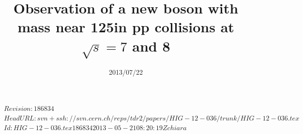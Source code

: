 \documentclass[12pt,twoside,a4paper,cmspaper,final,collab]{cms-tdr}
\begin{document}



\RCS$Revision: 186834 $
\RCS$HeadURL: svn+ssh://svn.cern.ch/reps/tdr2/papers/HIG-12-036/trunk/HIG-12-036.tex $
\RCS$Id: HIG-12-036.tex 186834 2013-05-21 08:20:19Z chiara $

\newlength\cmsFigWidth
{}%
  {\setlength{}}
\newlength\cmsFigWideWidth
{}%
  {\setlength{}}
%
  {\providecommand{\cmsRight}{right}}
\newcommand{\re}{\ensuremath{\cmsSymbolFace{e}}}

\providecommand{\Mjj}{\ensuremath{\mathit{m}(\mathrm{jj})}}
\providecommand{\ZllH}{\ensuremath{\cPZ(\ell\ell)\PH}}
\providecommand{\WlnH}{\ensuremath{\PW(\ell\cPgn)\PH}}
\providecommand\WtoLN {\ensuremath{\PW\to\ell\cPgn}}
\providecommand{\ZtoNN}{\ensuremath{\cPZ\to\cPgn\cPagn}}
\providecommand{\ZtoLL}{\ensuremath{\cPZ\to\ell\ell}}
\providecommand{\HBB}{\ensuremath{\PH\to \cPqb\cPqb}}
\providecommand{\ptjj}{\ensuremath{{\pt}(\mathrm{jj})}}
\providecommand{\dRJJ}{\ensuremath{\Delta R(\mathrm{j_1,j_2})}}
\providecommand{\dEtaJJ}{\ensuremath{|\Delta \eta(\mathrm{jj})|}}
\providecommand\dphiVH {\ensuremath{\Delta\phi(\mathrm{V,}\PH)}}
\providecommand{\dphiMJ}{\ensuremath{\Delta\phi(\mathrm{\MET,j})}}
\providecommand{\Naj}{\ensuremath{N_{\mathrm{aj}}}}
\providecommand{\Nal}{\ensuremath{N_{\mathrm{al}}}}
\title{Observation of a new boson with mass near  125\GeV in pp collisions at $\sqrt{s} = 7$ and 8\TeV}






\date{2013/07/22}
\end{document}
